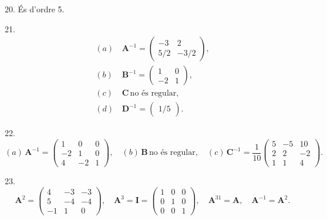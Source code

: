 \documentclass[12pt]{article}
\newcommand{\mat}[1]{\mathbf{#1}}
\begin{document}
\begin{exercici}
20. És d'ordre 5.
\end{exercici}

\begin{exercici}
21. 
\begin{align*}
(a) &\, \mat{A}^{-1} = 
\begin{pmatrix}
-3 & 2 \\
5/2 & -3/2
\end{pmatrix}, \\
(b) &\, \mat{B}^{-1} = 
\begin{pmatrix}
1 & 0 \\
-2 & 1
\end{pmatrix}, \\
(c) &\, \mat{C} \, \text{no és regular}, \\
(d) &\, \mat{D}^{-1} = \begin{pmatrix} 1/5 \end{pmatrix}.
\end{align*}

\end{exercici}

\begin{exercici}
22. 
\[
(a) \, \mat{A}^{-1} = 
\begin{pmatrix}
1 & 0 & 0 \\
-2 & 1 & 0 \\
4 & -2 & 1
\end{pmatrix}, \quad 
(b) \, \mat{B} \, \text{no és regular}, \quad 
(c) \, \mat{C}^{-1} = 
\frac{1}{10}
\begin{pmatrix}
5 & -5 & 10 \\
2 & 2 & -2 \\
1 & 1 & 4
\end{pmatrix}.
\]
\end{exercici}

\begin{exercici}
23. 
\[
\mat{A}^2 = 
\begin{pmatrix}
4 & -3 & -3 \\
5 & -4 & -4 \\
-1 & 1 & 0
\end{pmatrix}, \quad 
\mat{A}^3 = \mat{I} = 
\begin{pmatrix}
1 & 0 & 0 \\
0 & 1 & 0 \\
0 & 0 & 1
\end{pmatrix}, \quad 
\mat{A}^{31} = \mat{A}, \quad \mat{A}^{-1} = \mat{A}^2.
\]
\end{exercici}
\end{document}
